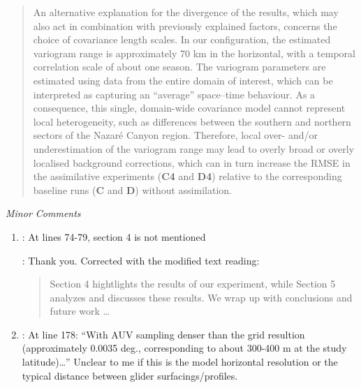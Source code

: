 \documentclass[a4paper]{article}
\begin{document}
\begin{answers}
\begin{enumerate}
\begin{quote}
    An alternative explanation for the divergence of the results,
    which may also act in combination with previously explained
    factors, concerns the choice of covariance length scales. In our
    configuration, the estimated variogram range is approximately 70
    km in the horizontal, with a temporal correlation scale of about
    one season. The variogram parameters are estimated using data from
    the entire domain of interest, which can be interpreted as
    capturing an ``average'' space--time behaviour. As a consequence,
    this single, domain-wide covariance model cannot represent local
    heterogeneity, such as differences between the southern and
    northern sectors of the Nazar\'{e} Canyon region. Therefore, local
    over- and/or underestimation of the variogram range may lead to
    overly broad or overly localised background corrections, which can
    in turn increase the RMSE in the assimilative experiments
    (\textbf{C4} and \textbf{D4}) relative to the corresponding
    baseline runs (\textbf{C} and \textbf{D}) without assimilation.

    \end{quote}
  

  \end{enumerate}

\item {\it Minor Comments}

  \begin{enumerate}

\item

  \reply: At lines 74-79, section 4 is not mentioned

  \action: Thank you. Corrected with the modified text reading:


  \begin{quote}

    Section 4 hightlights the results of our experiment, while Section
    5 analyzes and discusses these results. We wrap up with
    conclusions and future work \ldots

  \end{quote}
  
  \item

    \reply: At line 178: “With AUV sampling denser than the grid
    resultion (approximately 0.0035 deg., corresponding to about
    300-400 m at the study latitude)…” Unclear to me if this is the
    model horizontal resolution or the typical distance between glider
    surfacings/profiles.


\end{enumerate}
\end{answers}
\end{document}
